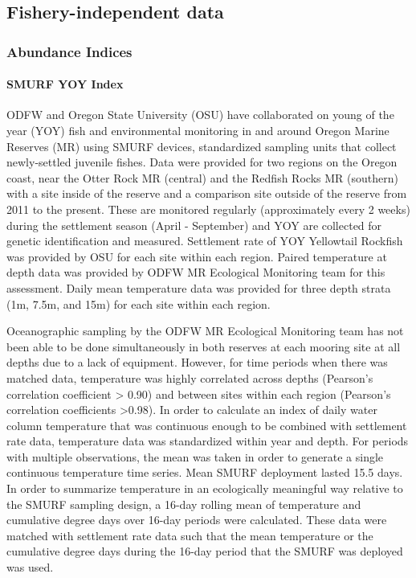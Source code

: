 \documentclass[
]{scrartcl}
\let\oldparagraph\paragraph
\renewcommand{\paragraph}[1]{\oldparagraph{#1}\mbox{}}
\begin{document}
\subsection{Fishery-independent data}\label{fishery-independent-data}

\subsubsection{Abundance Indices}\label{abundance-indices-1}

\paragraph{SMURF YOY Index}\label{smurf-yoy-index}

ODFW and Oregon State University (OSU) have collaborated on young of the
year (YOY) fish and environmental monitoring in and around Oregon Marine
Reserves (MR) using SMURF devices, standardized sampling units that
collect newly-settled juvenile fishes. Data were provided for two
regions on the Oregon coast, near the Otter Rock MR (central) and the
Redfish Rocks MR (southern) with a site inside of the reserve and a
comparison site outside of the reserve from 2011 to the present. These
are monitored regularly (approximately every 2 weeks) during the
settlement season (April - September) and YOY are collected for genetic
identification and measured. Settlement rate of YOY Yellowtail Rockfish
was provided by OSU for each site within each region. Paired temperature
at depth data was provided by ODFW MR Ecological Monitoring team for
this assessment. Daily mean temperature data was provided for three
depth strata (1m, 7.5m, and 15m) for each site within each region.

Oceanographic sampling by the ODFW MR Ecological Monitoring team has not
been able to be done simultaneously in both reserves at each mooring
site at all depths due to a lack of equipment. However, for time periods
when there was matched data, temperature was highly correlated across
depths (Pearson's correlation coefficient \textgreater{} 0.90) and
between sites within each region (Pearson's correlation coefficients
\textgreater0.98). In order to calculate an index of daily water column
temperature that was continuous enough to be combined with settlement
rate data, temperature data was standardized within year and depth. For
periods with multiple observations, the mean was taken in order to
generate a single continuous temperature time series. Mean SMURF
deployment lasted 15.5 days. In order to summarize temperature in an
ecologically meaningful way relative to the SMURF sampling design, a
16-day rolling mean of temperature and cumulative degree days over
16-day periods were calculated. These data were matched with settlement
rate data such that the mean temperature or the cumulative degree days
during the 16-day period that the SMURF was deployed was used.
\end{document}
